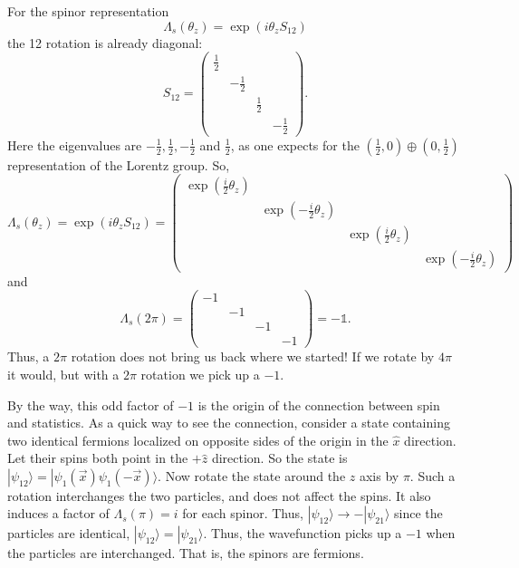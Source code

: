 \documentclass[11pt]{article}
\theoremstyle{definition}
\begin{document}
For the spinor representation
\begin{equation}
\Lambda_s (\theta_z) = \exp(i\theta_z S_{12})
\end{equation}
the 12 rotation is already diagonal:
\begin{equation}
S_{12} = \begin{pmatrix}
\frac{1}{2} &  & & \\
&-\frac{1}{2}&&\\
& & \frac{1}{2} \\
& & & -\frac{1}{2}
\end{pmatrix}.
\end{equation}
Here the eigenvalues are \(-\frac{1}{2}, \frac{1}{2}, -\frac{1}{2}\) and \(\frac{1}{2}\), as one expects for the \(\left( \frac{1}{2}, 0 \right) \oplus \left( 0, \frac{1}{2} \right)\) representation of the Lorentz group. So,
\begin{equation}
\Lambda_s (\theta_z) = \exp(i\theta_z S_{12}) = \begin{pmatrix}
\exp\left(\frac{i}{2}\theta_z\right) & & & \\
& \exp\left(-\frac{i}{2}\theta_z\right)&&\\
& & \exp\left(\frac{i}{2}\theta_z\right) \\
& & & \exp\left(-\frac{i}{2}\theta_z\right)
\end{pmatrix}
\end{equation}
and
\begin{equation}
\Lambda_s (2\pi) = \begin{pmatrix}
-1 &  & & \\
& -1 & & \\
&&-1&\\
& & & -1
\end{pmatrix} = -\mathds{1}.
\end{equation}
Thus, a \( 2\pi \) rotation does not bring us back where we started! If we rotate by \( 4\pi \) it would, but with a \( 2\pi \) rotation we pick up a \(-1\).

By the way, this odd factor of \(-1\) is the origin of the connection between spin and statistics. As a quick way to see the connection, consider a state containing two identical fermions localized on opposite sides of the origin in the \(\hat{x}\) direction. Let their spins both point in the \(+\hat{z}\) direction. So the state is \(|\psi_{12}\rangle = |\psi_1(\vec{x})\psi_1(-\vec{x})\rangle\). Now rotate the state around the \(z\) axis by \(\pi\). Such a rotation interchanges the two particles, and does not affect the spins. It also induces a factor of \(\Lambda_s(\pi) = i\) for each spinor. Thus, \(|\psi_{12}\rangle \rightarrow -|\psi_{21}\rangle\) since the particles are identical, \(|\psi_{12}\rangle = |\psi_{21}\rangle\). Thus, the wavefunction picks up a \(-1\) when the particles are interchanged. That is, the spinors are fermions.
\end{document}
